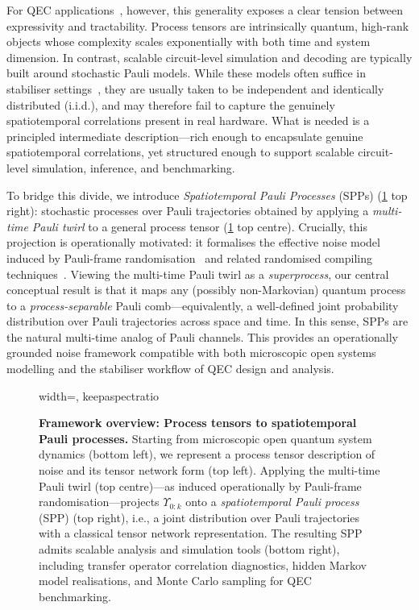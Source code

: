 For QEC applications~\cite{kobayashiTensornetworkDecodersProcess2024}, however, this generality exposes a clear tension between expressivity and tractability. Process tensors are intrinsically quantum, high-rank objects whose complexity scales exponentially with both time and system dimension. In contrast, scalable circuit-level simulation and decoding are typically built around stochastic Pauli models. While these models often suffice in stabiliser settings~\cite{gottesmanStabilizerCodesQuantum1997}, they are usually taken to be independent and identically distributed (i.i.d.), and may therefore fail to capture the genuinely spatiotemporal correlations present in real hardware. What is needed is a principled intermediate description---rich enough to encapsulate genuine spatiotemporal correlations, yet structured enough to support scalable circuit-level simulation, inference, and benchmarking.

To bridge this divide, we introduce \emph{Spatiotemporal Pauli Processes} (SPPs) (\cref{fig:paper-overview} top right): stochastic processes over Pauli trajectories obtained by applying a \emph{multi-time Pauli twirl} to a general process tensor (\cref{fig:paper-overview} top centre). Crucially, this projection is operationally motivated: it formalises the effective noise model induced by Pauli-frame randomisation~\cite{silvaScalableProtocolIdentification2008,magesanModelingQuantumNoise2013} and related randomised compiling techniques~\cite{wallmanNoiseTailoringScalable2016,wareExperimentalPauliframeRandomization2021,bealeRandomizedCompilingFaulttolerant2023,jainImprovedQuantumError2023}. Viewing the multi-time Pauli twirl as a \emph{superprocess}, our central conceptual result is that it maps any (possibly non-Markovian) quantum process to a \emph{process-separable} Pauli comb---equivalently, a well-defined joint probability distribution over Pauli trajectories across space and time. In this sense, SPPs are the natural multi-time analog of Pauli channels. This provides an operationally grounded noise framework compatible with both microscopic open systems modelling and the stabiliser workflow of QEC design and analysis.

\begin{figure}[t]
    \centering
    \begin{adjustbox}{width=\textwidth, keepaspectratio}
        
    \end{adjustbox}
    \caption{\textbf{Framework overview: Process tensors to spatiotemporal Pauli processes.} Starting from microscopic open quantum system dynamics (bottom left), we represent a process tensor description of noise and its tensor network form (top left). Applying the multi-time Pauli twirl (top centre)---as induced operationally by Pauli-frame randomisation---projects \(\Upsilon_{0:k}\) onto a \emph{spatiotemporal Pauli process} (SPP) (top right), i.e., a joint distribution over Pauli  trajectories with a classical tensor network representation. The resulting SPP admits scalable analysis and simulation tools (bottom right), including transfer operator correlation diagnostics, hidden Markov model realisations, and Monte Carlo sampling for QEC benchmarking.}
    \label{fig:paper-overview}
\end{figure}

